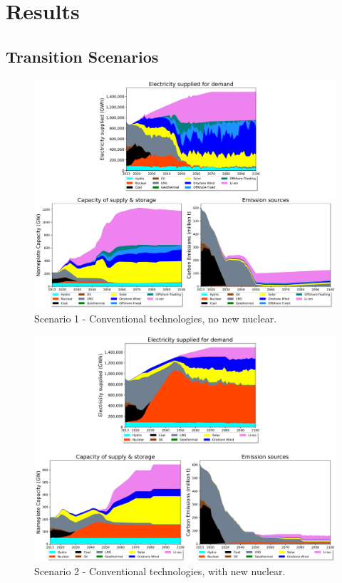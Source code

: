 \section{Results} \label{Results-and-discussion}

\subsection{Transition Scenarios}

\begin{figure}[H] 
\centering
\includegraphics[scale=0.5]{figures/conv_nonuc}
\caption{Scenario 1 - Conventional technologies, no new nuclear.}
\label{scen1}
\end{figure}

\begin{figure}[H] 
\centering
\includegraphics[scale=0.5]{figures/conv_nuc}
\caption{Scenario 2 - Conventional technologies, with new nuclear.}
\label{scen2}
\end{figure}

